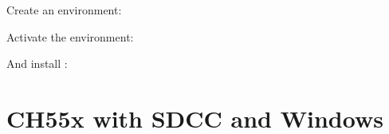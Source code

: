 \documentclass[letterpaper,10pt,english]{sphinxmanual}
\begin{document}
\sphinxAtStartPar
Create an environment:

\begin{sphinxVerbatim}[commandchars=\\\{\}]
   
\end{sphinxVerbatim}

\sphinxAtStartPar
Activate the environment:

\begin{sphinxVerbatim}[commandchars=\\\{\}]
 
\end{sphinxVerbatim}

\sphinxAtStartPar
And install :

\begin{sphinxVerbatim}[commandchars=\\\{\}]
  
\end{sphinxVerbatim}

\sphinxstepscope


\chapter{CH55x with SDCC and Windows}
\label{\detokenize{install_windows:ch55x-with-sdcc-and-windows}}\label{\detokenize{install_windows::doc}}
\end{document}
